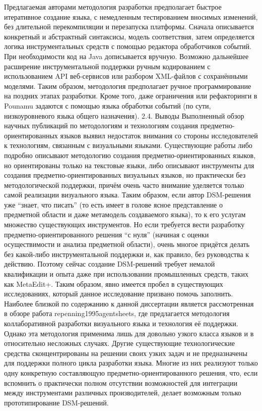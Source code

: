 	Предлагаемая авторами методология разработки предполагает быстрое итеративное создание языка, с немедленным тестированием вносимых изменений, без длительной перекомпиляции и перезапуска платформы. Сначала описывается конкретный и абстрактный синтаксисы, модель соответствия, затем определяется логика инструментальных средств с помощью редактора обработчиков событий. При необходимости код на Java дописывается вручную. Возможно дальнейшее расширение инструментальной поддержки ручным кодированием с использованием API веб-сервисов или разбором XML-файлов с сохранёнными моделями. Таким образом, методология предполагает ручное программирование на поздних этапах разработки. Кроме того, даже ограничения или рефакторинги в Pounamu задаются с помощью языка обработки событий (по сути, низкоуровневого языка общего назначения).
2.4. Выводы
	Выполненный обзор научных публикаций по методологиям и технологиям создания предметно-ориентированных языков выявил недостаток внимания со стороны исследователей к технологиям, связанным с визуальными языками. Существующие работы либо подробно описывают методологию создания предметно-ориентированных языков, но ориентированы только на текстовые языки, либо описывают инструменты для создания предметно-ориентированных визуальных языков, но практически без методологической поддержки, причём очень часто внимание уделяется только самой реализации визуального языка. Таким образом, если автор DSM-решения уже “знает, что писать” (то есть имеет в голове ясное представление о предметной области и даже метамодель создаваемого языка), то к его услугам множество существующих инструментов. Но если требуется вести разработку предметно-ориентированного решения “с нуля” (начиная с оценки осуществимости и анализа предметной области), очень многое придётся делать без какой-либо инструментальной поддержки и, как правило, без руководства к действию. Поэтому сейчас создание DSM-решений требует немалой квалификации и опыта даже при использовании промышленных средств, таких как MetaEdit+. 
Таким образом, явно имеется пробел в существующих исследованиях, который данное исследование призвано помочь заполнить. Наиболее близкой по содержанию к данной диссертации является рассмотренная в обзоре работа repenning1995agentsheets, где предлагается методология коллаборативной разработки визуального языка и технология её поддержки. Однако эта методология применима лишь для довольно узкого класса языков и в относительно несложных случаях. Другие существующие технологические средства сконцентрированы на решении своих узких задач и не предназначены для поддержки полного цикла разработки языка. Многие из них реализуют только одну конкретную составляющую предметно-ориентированного решения, что, если вспомнить о практически полном отсутствии возможностей для интеграции между инструментами различных производителей, делает возможным только прототипирование DSM-решений. 

